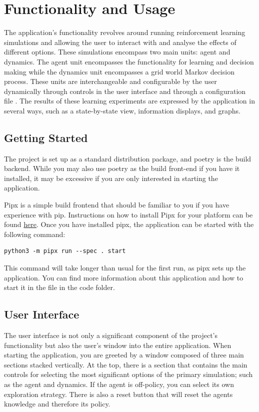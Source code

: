 \documentclass[]{final_report}
\begin{document}
\newpage
\section{Functionality and Usage}

The application's functionality revolves around running reinforcement learning simulations and allowing the user to interact with and analyse the effects of different options. These simulations encompass two main units: agent and dynamics. The agent unit encompasses the functionality for learning and decision making while the dynamics unit encompasses a grid world Markov decision process. These units are interchangeable and configurable by the user dynamically through controls in the user interface and through a configuration file . The results of these learning experiments are expressed by the application in several ways, such as a state-by-state view, information displays, and graphs.


\subsection{Getting Started}

The project is set up as a standard distribution package, and poetry is the build backend. While you may also use poetry as the build front-end if you have it installed, it may be excessive if you are only interested in starting the application.

Pipx is a simple build frontend that should be familiar to you if you have experience with pip. Instructions on how to install Pipx for your platform can be found \href{https://pipx.pypa.io/stable/installation/}{here}. Once you have installed pipx, the application can be started with the following command:
\begin{verbatim}
python3 -m pipx run --spec . start
\end{verbatim}
This command will take longer than usual for the first run, as pipx sets up the application. You can find more information about this application and how to start it in the  file in the code folder.

\subsection{User Interface}

The user interface is not only a significant component of the project's functionality but also the user's window into the entire application. When starting the application, you are greeted by a window composed of three main sections stacked vertically. At the top, there is a section that contains the main controls for selecting the most significant options of the primary simulation; such as the agent and dynamics. If the agent is off-policy, you can select its own exploration strategy. There is also a reset button that will reset the agents knowledge and therefore its policy.
\end{document}
